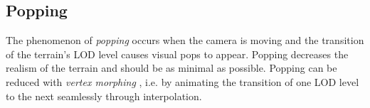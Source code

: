 \subsection{Popping}
The phenomenon of \textit{popping} occurs when the camera is moving 
and the transition of the terrain's LOD level causes visual pops to appear.
Popping decreases the realism of the terrain and should be as minimal as possible.
Popping can be reduced with \textit{vertex morphing} \cite{geomipmapping,geomclipmaps,cdlod}, 
i.e. by animating the transition of one LOD level to the next seamlessly through interpolation.